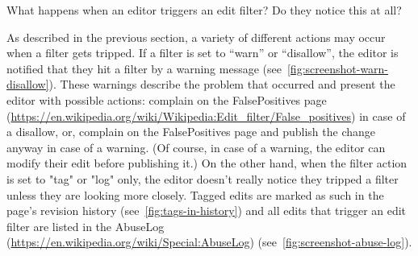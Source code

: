 What happens when an editor triggers an edit filter? Do they notice this at all?

As described in the previous section, a variety of different actions may occur when a filter gets tripped.
If a filter is set to ``warn'' or ``disallow'', the editor is notified that they hit a filter by a warning message (see~\ref{fig:screenshot-warn-disallow}).
These warnings describe the problem that occurred and present the editor with possible actions:
complain on the FalsePositives page (\url{https://en.wikipedia.org/wiki/Wikipedia:Edit_filter/False_positives}) in case of a disallow,
or, complain on the FalsePositives page and publish the change anyway in case of a warning.
(Of course, in case of a warning, the editor can modify their edit before publishing it.)
On the other hand, when the filter action is set to "tag" or "log" only, the editor doesn't really notice they tripped a filter unless they are looking more closely.
Tagged edits are marked as such in the page's revision history (see~\ref{fig:tags-in-history})
and all edits that trigger an edit filter are listed in the AbuseLog (\url{https://en.wikipedia.org/wiki/Special:AbuseLog}) (see~\ref{fig:screenshot-abuse-log}).

